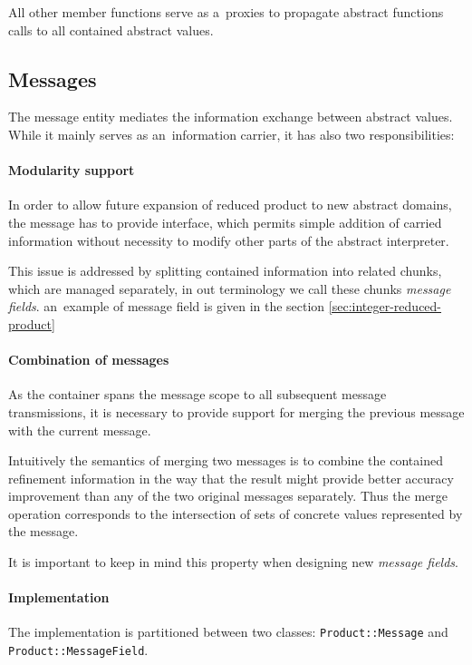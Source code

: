 \documentclass[12pt,oneside]{fithesis2}
\theoremstyle{definition}
\begin{document}
All other member functions serve as a~proxies to propagate abstract functions calls to all contained abstract values.

\subsection{Messages}

The message entity mediates the information exchange between abstract values. While it mainly serves as an~information carrier, it has also two responsibilities:

\paragraph{Modularity support}
In order to allow future expansion of reduced product to new abstract domains, the message has to provide interface, which permits simple addition of carried information without necessity to modify other parts of the abstract interpreter.

This issue is addressed by splitting contained information into related chunks, which are managed separately, in out terminology we call these chunks \textit{message fields}. an~example of message field is given in the section \ref{sec:integer-reduced-product}

\paragraph{Combination of messages}
As the container spans the message scope to all subsequent message transmissions, it is necessary to provide support for merging the previous message with the current message.

Intuitively the semantics of merging two messages is to combine the contained refinement information in the way that the result might provide better accuracy improvement than any of the two original messages separately. Thus the merge operation corresponds to the intersection of sets of concrete values represented by the message.

It is important to keep in mind this property when designing new \textit{message fields}.

\paragraph{Implementation}
The implementation is partitioned between two classes: \texttt{Product::Message} and \texttt{Product::MessageField}.
\end{document}
